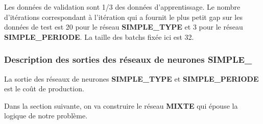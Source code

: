 
 Les données de validation sont 1/3 des données d'apprentissage. Le nombre d'itérations correspondant à l'itération qui a fournit le plus petit gap sur les données de test est 20 pour le réseau \textbf{SIMPLE\_TYPE} et 3 pour le réseau \textbf{SIMPLE\_PERIODE}. La taille des batchs fixée ici est 32.
\subsubsection{Description des sorties des réseaux de neurones \textbf{SIMPLE\_}}
La sortie des réseaux de neurones \textbf{SIMPLE\_TYPE} et \textbf{SIMPLE\_PERIODE} est le coût de production.


Dans la section suivante, on va construire le réseau \textbf{MIXTE} qui épouse la logique de notre problème.

